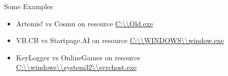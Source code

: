 \documentclass{beamer}
\begin{document}
\begin{frame}{Some Examples}
  \begin{itemize}
    \item Artemis! vs Cosmu on resource \url{C:\\Old.exe}
    \item VB.CB vs Startpage.AI on resource \url{C:\\WINDOWS\\window.exe}
    \item KeyLogger vs OnlineGames on resource \url{C:\\windows\\system32\\svrchost.exe}
  \end{itemize}
\end{frame}
\end{document}
